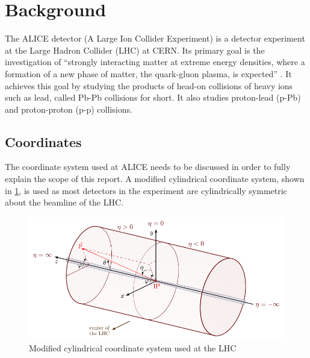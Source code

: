 \documentclass[11pt]{article}
\numberwithin{equation}{section}
\numberwithin{figure}{section}
\numberwithin{table}{section}
\begin{document}
    

\section{Background}
The ALICE detector (A Large Ion Collider Experiment) is a detector experiment at the Large Hadron Collider (LHC) at CERN. Its primary goal is the investigation of ``strongly interacting matter at extreme energy densities, where a formation of a new phase of matter, the quark-gluon plasma, is expected'' \cite{ALICE_LOI}. It achieves this goal by studying the products of head-on collisions of heavy ions such as lead, called Pb-Pb collisions for short. It also studies proton-lead (p-Pb) and proton-proton (p-p) collisions.  



\subsection{Coordinates}
The coordinate system used at ALICE needs to be discussed in order to fully explain the scope of this report. A modified cylindrical coordinate system, shown in \cref{fig:coords}, is used as most detectors in the experiment are cylindrically symmetric about the beamline of the LHC. 

\begin{figure}[h]
    \begin{center}
        \includegraphics[width=.8\textwidth]{Figs/coords.pdf}
        \caption{Modified cylindrical coordinate system used at the LHC \cite{coords}}
        \label{fig:coords}
    \end{center}
\end{figure}
\end{document}
